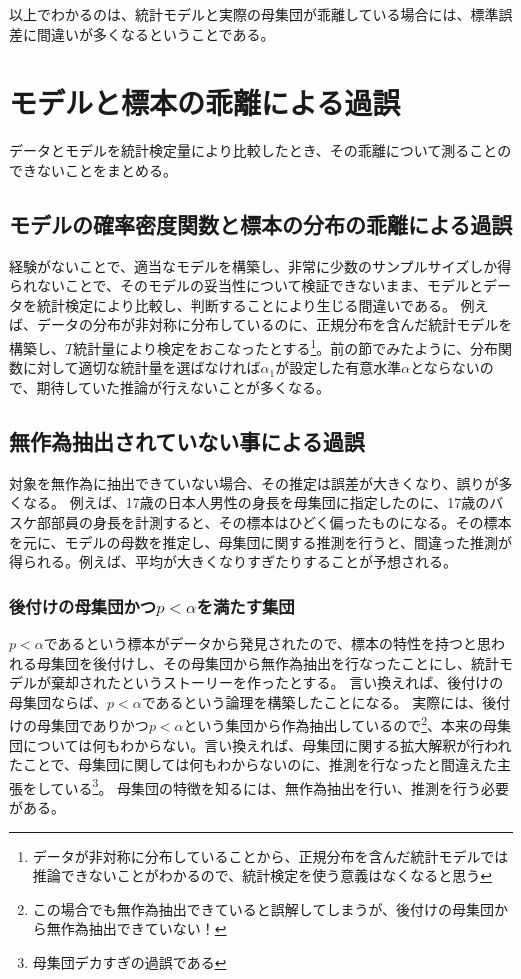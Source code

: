 \documentclass[a4paper,11pt,dvipdfmx]{jsarticle}
\begin{document}
以上でわかるのは、統計モデルと実際の母集団が乖離している場合には、標準誤差に間違いが多くなるということである。


\section{モデルと標本の乖離による過誤}
データとモデルを統計検定量により比較したとき、その乖離について測ることのできないことをまとめる。

\subsection{モデルの確率密度関数と標本の分布の乖離による過誤}
経験がないことで、適当なモデルを構築し、非常に少数のサンプルサイズしか得られないことで、そのモデルの妥当性について検証できないまま、モデルとデータを統計検定により比較し、判断することにより生じる間違いである。
例えば、データの分布が非対称に分布しているのに、正規分布を含んだ統計モデルを構築し、$T$統計量により検定をおこなったとする\footnote{データが非対称に分布していることから、正規分布を含んだ統計モデルでは推論できないことがわかるので、統計検定を使う意義はなくなると思う}。前の節でみたように、分布関数に対して適切な統計量を選ばなければ$\alpha_1$が設定した有意水準$\alpha$とならないので、期待していた推論が行えないことが多くなる。

\subsection{無作為抽出されていない事による過誤}
対象を無作為に抽出できていない場合、その推定は誤差が大きくなり、誤りが多くなる。
例えば、17歳の日本人男性の身長を母集団に指定したのに、17歳のバスケ部部員の身長を計測すると、その標本はひどく偏ったものになる。その標本を元に、モデルの母数を推定し、母集団に関する推測を行うと、間違った推測が得られる。例えば、平均が大きくなりすぎたりすることが予想される。


\subsubsection{後付けの母集団かつ$p<\alpha$を満たす集団}
$p<\alpha$であるという標本がデータから発見されたので、標本の特性を持つと思われる母集団を後付けし、その母集団から無作為抽出を行なったことにし、統計モデルが棄却されたというストーリーを作ったとする。
言い換えれば、後付けの母集団ならば、$p<\alpha$であるという論理を構築したことになる。
実際には、後付けの母集団でありかつ$p<\alpha$という集団から作為抽出しているので\footnote{この場合でも無作為抽出できていると誤解してしまうが、後付けの母集団から無作為抽出できていない！}、本来の母集団については何もわからない。言い換えれば、母集団に関する拡大解釈が行われたことで、母集団に関しては何もわからないのに、推測を行なったと間違えた主張をしている\footnote{母集団デカすぎの過誤である}。
母集団の特徴を知るには、無作為抽出を行い、推測を行う必要がある。
\end{document}
